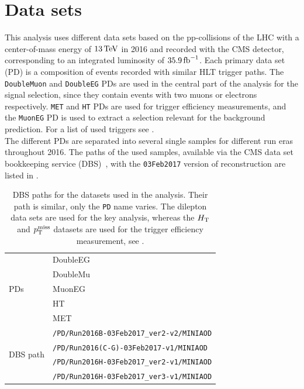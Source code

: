 \section{Data sets}\label{sec:datasets}
This analysis uses different data sets based on the pp-collisions of the LHC with a center-of-mass energy of $13\,\text{Te\hspace{-.08em}V}$ in 2016 and recorded with the CMS detector, corresponding to an integrated luminosity of $35.9\mbox{\ensuremath{\,\text{fb}^\text{$-$1}}}$. Each primary data set (PD) is a composition of events recorded with similar HLT trigger paths. The \texttt{DoubleMuon} and \texttt{DoubleEG} PDs are used in the central part of the analysis for the signal selection, since they contain events with two muons or electrons respectively. \texttt{MET} and \texttt{HT} PDs are used for trigger efficiency measurements, and the \texttt{MuonEG} PD is used to extract a selection relevant for the background prediction. For a list of used triggers see .\\
The different PDs are separated into several single samples for different run eras throughout 2016. The paths of the used samples, available via the CMS data set bookkeeping service (DBS)~\cite{DASBookkeeping}, with the \texttt{03Feb2017} version of reconstruction are listed in .

\begin{table}[htb]
 \centering
 \caption{DBS paths for the datasets used in the analysis. Their path is similar, only the \texttt{PD} name varies. The dilepton data sets are used for the key analysis, whereas the $H_{\mathrm{T}}$ and $p_{\mathrm{T}}^\text{miss}$ datasets are used for the trigger efficiency measurement, see .}
 \label{tab:datasets}
 \begin{tabular}{l|l}
  \hline
  \multirow{5}{*}{PDs}       & DoubleEG               \\
                             & DoubleMu               \\
                             & MuonEG                 \\
                             & HT                     \\
                             & MET                    \\\hline\hline
  \multirow{ 4}{*}{DBS path} & \verb|/PD/Run2016B-03Feb2017_ver2-v2/MINIAOD| \\
                             & \verb|/PD/Run2016(C-G)-03Feb2017-v1/MINIAOD| \\
                             & \verb|/PD/Run2016H-03Feb2017_ver2-v1/MINIAOD| \\
                             & \verb|/PD/Run2016H-03Feb2017_ver3-v1/MINIAOD| \\
  \hline
 \end{tabular}
\end{table}


